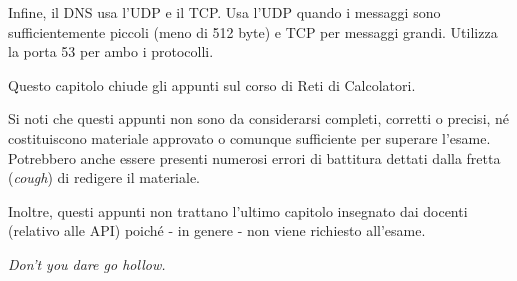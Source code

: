         \vspace{3mm}
        
        Infine, il DNS usa l'UDP e il TCP. Usa l'UDP quando i messaggi sono sufficientemente piccoli (meno di 512 byte) e TCP per messaggi grandi. Utilizza la porta 53 per ambo i protocolli.
        
    \vspace{20mm}
    
    Questo capitolo chiude gli appunti sul corso di Reti di Calcolatori. 
    
    Si noti che questi appunti non sono da considerarsi completi, corretti o precisi, né costituiscono materiale approvato o comunque sufficiente per superare l'esame. Potrebbero anche essere presenti numerosi errori di battitura dettati dalla fretta (\textit{cough}) di redigere il materiale.
    
    Inoltre, questi appunti non trattano l'ultimo capitolo insegnato dai docenti (relativo alle API) poiché - in genere - non viene richiesto all'esame.
    
    \vspace{5mm}
    
    \textit{Don't you dare go hollow.}